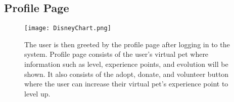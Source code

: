 \subsection{Profile Page}
\begin{figure}[H]                %
	\centering                    %
	\texttt{[image: DisneyChart.png]}      %
	\caption{
		The user is then greeted by the profile page after logging in to the system. Profile page consists of the user’s virtual pet where information such as level, experience points, and evolution will be shown. It also consists of the adopt, donate, and volunteer button where the user can increase their  virtual pet’s experience point to level up.}
	\label{fig:Index}
\end{figure}

